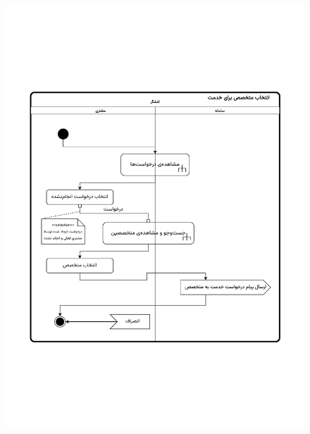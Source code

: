 \begin{figure}[ht!]
	\centering
	\includegraphics[scale=0.8, page=1]{figs/OOD-activity-selectspecreq.pdf}
\end{figure}
\FloatBarrier
\newpage


